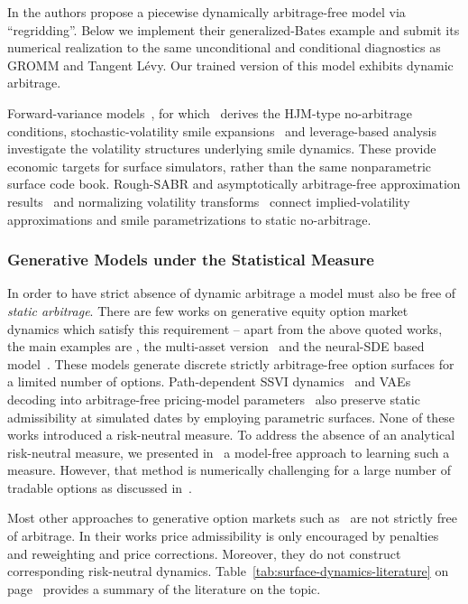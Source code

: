 \documentclass[11pt]{article}
\theoremstyle{plain}
\theoremstyle{definition}
\theoremstyle{remark}
\begin{document}
In \cite{DysLitGambaraTeichmann2021} the authors propose a piecewise
dynamically arbitrage-free model via ``regridding''.  Below we implement their
generalized-Bates example and submit its numerical realization to the same
unconditional and conditional diagnostics as GROMM and Tangent L\'evy. Our trained version of this
model exhibits dynamic arbitrage.

Forward-variance models~\citep{DysLitBergomi2005,bergomi2008smile}, for which~\cite{buehler2006consistent} derives the HJM-type no-arbitrage conditions, stochastic-volatility smile expansions~\citep{bergomi2012stochastic} and leverage-based analysis~\citep{DysLitCilibertiBouchaudPotters2008} investigate the volatility structures underlying smile dynamics. These provide economic targets for surface simulators, rather than the same nonparametric surface code book. Rough-SABR and asymptotically arbitrage-free approximation results~\citep{DysLitFukasawaGatheral2022,DysLitFukasawa2022} and normalizing volatility transforms~\citep{lucic2021normalizing} connect implied-volatility approximations and smile parametrizations to static no-arbitrage.

\subsubsection*{Generative Models under the Statistical Measure}

In order to have strict absence of dynamic arbitrage a model must also be free of \emph{static arbitrage}.
There are few works on generative equity option market dynamics which satisfy this requirement -- apart from the above quoted works, the main
examples are \cite{wiese2019simulate}, the multi-asset version~\citep{wiese2021multiassetspotoptionmarket} and
the neural-SDE based model~\citep{Cohen02012023}. These models generate
discrete strictly arbitrage-free option surfaces for a limited number of options. Path-dependent SSVI dynamics~\citep{AndresBoumezouedJourdain2023} and VAEs decoding into arbitrage-free pricing-model parameters~\citep{vae_ning2023arbitrage} also preserve static admissibility at simulated dates by employing parametric surfaces. None of these works introduced a risk-neutral measure. To address the absence of an analytical risk-neutral measure, we presented in~\cite{removedrift} a model-free approach to learning such a measure. However, that method is numerically challenging for a large number of tradable options as discussed in~\cite{DYSANOS2026}.

Most other approaches to generative option markets such as~\cite{BergeronEtAl2021,ZhangLiZhang2021,ContVuletic2023,ChoudharyJaimungalBergeron2024,VuleticCont2024,JinAgarwal2025,BrooksEtAl2026,HaoJi2026,HanEtAl2026,YangWangZhangLi2026,BucheggerGonon2026} are not strictly free of arbitrage. In their works price admissibility is only encouraged by penalties and reweighting and price corrections. Moreover, they do not construct corresponding risk-neutral dynamics. Table~\ref{tab:surface-dynamics-literature}
on page~\pageref{tab:surface-dynamics-literature} provides a summary of the literature on the topic.
\end{document}
